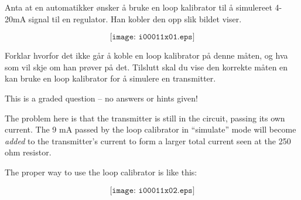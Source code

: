 

Anta at en automatikker ønsker å bruke en loop kalibrator til å simulereet 4-20mA signal til en regulator. Han kobler den opp slik bildet viser. 

$$\texttt{[image: i00011x01.eps]}$$

Forklar hvorfor det ikke går å koble en loop kalibrator på denne måten, og hva som vil skje om han prøver på det. Tilslutt skal du vise den korrekte måten en kan bruke en loop kalibrator for å simulere en transmitter. 

\vfil

\eject






This is a graded question -- no answers or hints given!







The problem here is that the transmitter is still in the circuit, passing its own current.  The 9 mA passed by the loop calibrator in ``simulate'' mode will become {\it added} to the transmitter's current to form a larger total current seen at the 250 ohm resistor.

The proper way to use the loop calibrator is like this:

$$\texttt{[image: i00011x02.eps]}$$




